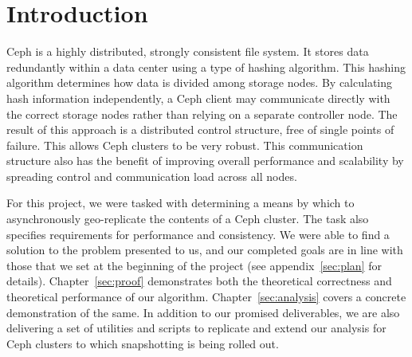 \chapter{Introduction}
\label{sec:introduction}

Ceph is a highly distributed, strongly consistent file system. It
stores data redundantly within a data center using a type of hashing
algorithm. This hashing algorithm determines how data is divided among
storage nodes.  By calculating hash information independently, a Ceph
client may communicate directly with the correct storage nodes rather
than relying on a separate controller node. The result of this
approach is a distributed control structure, free of single points of
failure. This allows Ceph clusters to be very robust. This
communication structure also has the benefit of improving overall
performance and scalability by spreading control and communication
load across all nodes.

For this project, we were tasked with determining a means by which to
asynchronously geo-replicate the contents of a Ceph cluster. The task
also specifies requirements for performance and consistency. We were
able to find a solution to the problem presented to us, and our
completed goals are in line with those that we set at the beginning of
the project (see appendix~\ref{sec:plan} for details).
Chapter~\ref{sec:proof} demonstrates both the theoretical correctness
and theoretical performance of our
algorithm. Chapter~\ref{sec:analysis} covers a concrete demonstration
of the same. In addition to our promised deliverables, we are also
delivering a set of utilities and scripts to replicate and extend our
analysis for Ceph clusters to which snapshotting is being rolled out.
